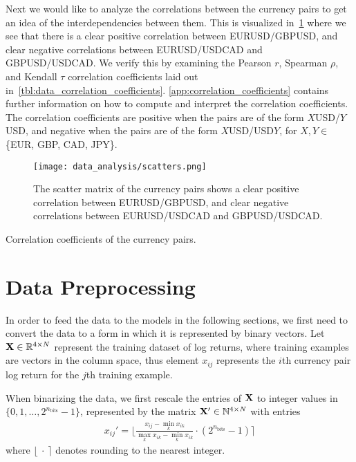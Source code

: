 Next we would like to analyze the correlations between the currency pairs to get an idea of the interdependencies between them.
This is visualized in~\cref{fig:scatters} where we see that there is a clear positive correlation between EURUSD/GBPUSD, and clear negative correlations between EURUSD/USDCAD and GBPUSD/USDCAD.
We verify this by examining the Pearson \( r \), Spearman \( \rho \), and Kendall \( \tau \) correlation coefficients laid out in~\cref{tbl:data_correlation_coefficients}.
\cref{app:correlation_coefficients} contains further information on how to compute and interpret the correlation coefficients.
The correlation coefficients are positive when the pairs are of the form \( X \)USD/\( Y \)USD, and negative when the pairs are of the form \( X \)USD/USD\( Y \), for \( X,Y \in \) \{EUR, GBP, CAD, JPY\}.
\begin{figure}[!htb]
    \begin{center}
        \texttt{[image: data\_analysis/scatters.png]}
    \end{center}
    \caption{The scatter matrix of the currency pairs shows a clear positive correlation between EURUSD/GBPUSD, and clear negative correlations between EURUSD/USDCAD and GBPUSD/USDCAD.}
    \label{fig:scatters}
\end{figure}

\begin{table}[!htb]
    \centering
    \begin{adjustbox}{max width=\textwidth}
        
    \end{adjustbox}
    \caption{Correlation coefficients of the currency pairs.}
    \label{tbl:data_correlation_coefficients}
\end{table}


\section{Data Preprocessing}
In order to feed the data to the models in the following sections, we first need to convert the data to a form in which it is represented by binary vectors.
Let \( \mathbf{X} \in \mathbb{R}^{4 \times N} \) represent the training dataset of log returns, where training examples are vectors in the column space, thus element \( x_{ij} \) represents the \( i \)th currency pair log return for the \( j \)th training example.

When binarizing the data, we first rescale the entries of \( \mathbf{X} \) to integer values in \( \{0, 1, \dots, 2^{n_\text{bits}} - 1\} \), represented by the matrix \( \mathbf{X}' \in \mathbb{N}^{4 \times N} \) with entries
\begin{align}
    x_{ij}' = \bigg\lfloor \frac{x_{ij} - \min_k x_{ik}}{\max_k x_{ik} - \min_k x_{ik}} \cdot (2^{n_\text{bits}} - 1) \bigg\rceil
\end{align}
where \( \lfloor \ \cdot \ \rceil \) denotes rounding to the nearest integer.

